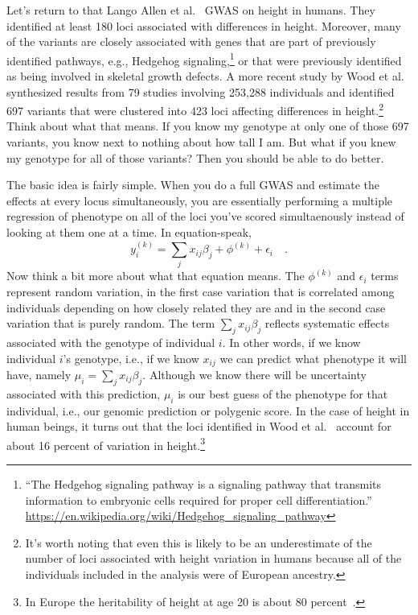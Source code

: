 \documentclass[12pt]{article}
\begin{document}
Let's return to that Lango Allen et al.~\cite{LangoAllen-etal-2010}
GWAS on height in humans. They identified at least 180 loci associated
with differences in height. Moreover, many of the variants are closely
associated with genes that are part of previously identified pathways,
e.g., Hedgehog signaling,\footnote{``The Hedgehog signaling pathway is
  a signaling pathway that transmits information to embryonic cells
  required for proper cell differentiation.''
  \url{https://en.wikipedia.org/wiki/Hedgehog_signaling_pathway}} or
that were previously identified as being involved in skeletal growth
defects. A more recent study by Wood et al.~\cite{Wood-etal-2014}
synthesized results from 79 studies involving 253,288 individuals and
identified 697 variants that were clustered into 423 loci affecting
differences in height.\footnote{It's worth noting that even this is
  likely to be an underestimate of the number of loci associated with
  height variation in humans because all of the individuals included
  in the analysis were of European ancestry.} Think about what that
means. If you know my genotype at only one of those 697 variants, you
know next to nothing about how tall I am. But what if you knew my
genotype for all of those variants? Then you should be able to do
better.

The basic idea is fairly simple. When you do a full GWAS and estimate
the effects at every locus simultaneously, you are essentially
performing a multiple regression of phenotype on all of the loci
you've scored simultaenously instead of looking at them one at a
time. In equation-speak,
\[
y_i^{(k)} = \sum_j x_{ij}\beta_j + \phi^{(k)} + \epsilon_i \quad .
\]
Now think a bit more about what that equation means. The $\phi^{(k)}$
and $\epsilon_i$ terms represent random variation, in the first case
variation that is correlated among individuals depending on how
closely related they are and in the second case variation that is
purely random. The term $\sum_j x_{ij}\beta_j$ reflects systematic
effects associated with the genotype of individual $i$. In other
words, if we know individual $i$'s genotype, i.e., if we know $x_{ij}$
we can predict what phenotype it will have, namely
$\mu_i = \sum_j x_{ij}\beta_j$. Although we know there will be
uncertainty associated with this prediction, $\mu_i$ is our best guess
of the phenotype for that individual, i.e., our genomic prediction or
polygenic score. In the case of height in human beings, it turns out
that the loci identified in Wood et al.~\cite{Wood-etal-2014} account
for about 16 percent of variation in height.\footnote{In Europe the
  heritability of height at age 20 is about 80
  percent~\cite{Jelenkovic-etal-2016}.}
\end{document}
